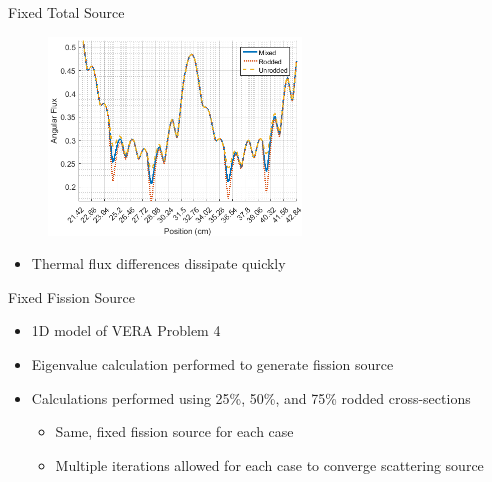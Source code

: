 
\begin{frame}[t]{Fixed Total Source}

\begin{figure}[H]
  \centering
  \includegraphics[width=0.6\textwidth]{../figs/1dmoc-50mix-fixedscat-angflux7.png}
\end{figure}
\begin{itemize}
  \item Thermal flux differences dissipate quickly
\end{itemize}

\end{frame}


\begin{frame}[t]{Fixed Fission Source}
    
    \begin{itemize}
      \item 1D model of VERA Problem 4
      \item Eigenvalue calculation performed to generate fission source
      \item Calculations performed using 25\%, 50\%, and 75\% rodded 
      cross-sections
      \begin{itemize}
        \item Same, fixed fission source for each case
        \item Multiple iterations allowed for each case to converge scattering 
        source
      \end{itemize}
    \end{itemize}
    
\end{frame}


